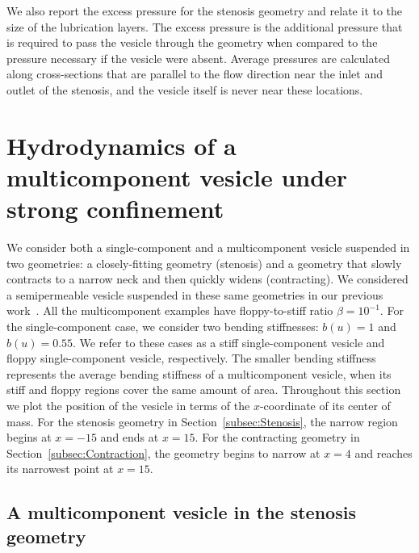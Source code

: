 \documentclass[twoside,twocolumn,9pt]{article}
\begin{document}
We also report the excess pressure for the stenosis geometry and relate
it to the size of the lubrication layers. The excess pressure is the
additional pressure that is required to pass the vesicle through the
geometry when compared to the pressure necessary if the vesicle were
absent. Average pressures are calculated along cross-sections that are
parallel to the flow direction near the inlet and outlet of the
stenosis, and the vesicle itself is never near these locations.

\section{\label{sec:results}Hydrodynamics of a multicomponent vesicle
under strong confinement}
We consider both a single-component and a multicomponent vesicle
suspended in two geometries: a closely-fitting geometry (stenosis) and a
geometry that slowly contracts to a narrow neck and then quickly widens
(contracting). We considered a semipermeable vesicle suspended in these
same geometries in our previous work~\cite{qua-gan-you2021}. All the
multicomponent examples have floppy-to-stiff ratio $\beta = 10^{-1}$.
For the single-component case, we consider two bending stiffnesses:
$b(u) = 1$ and $b(u) = 0.55$. We refer to these cases as a stiff
single-component vesicle and floppy single-component vesicle,
respectively. The smaller bending stiffness represents the average
bending stiffness of a multicomponent vesicle, when its stiff and floppy
regions cover the same amount of area. Throughout this section we plot
the position of the vesicle in terms of the $x$-coordinate of its center
of mass. For the stenosis geometry in Section~\ref{subsec:Stenosis}, the
narrow region begins at $x=-15$ and ends at $x=15$. For the contracting
geometry in Section~\ref{subsec:Contraction}, the geometry begins to
narrow at $x=4$ and reaches its narrowest point at $x=15$.


\subsection{\label{subsec:Stenosis}A multicomponent vesicle in the
stenosis geometry}
\end{document}
